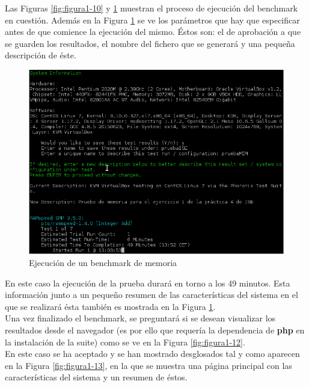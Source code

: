 Las Figuras \ref{fig:figura1-10} y \ref{fig:figura1-11} muestran el proceso de ejecución del benchmark en cuestión. Además en la Figura \ref{fig:figura1-11} se ve los parámetros que hay que especificar antes de que comience la ejecución del mismo. Éstos son: el de aprobación a que se guarden los resultados, el nombre del fichero que se generará y una pequeña descripción de éste.

\begin{figure}[H] %
	\centering
	\includegraphics[scale=0.8]{figuras/ejercicio1/figura1-11.png} 
	\caption{Ejecución de un benchmark de memoria} 
	\label{fig:figura1-11}
\end{figure}

En este caso la ejecución de la prueba durará en torno a los 49 minutos. Esta información junto a un pequeño resumen de las características del sistema en el que se realizará ésta también es mostrada en la Figura \ref{fig:figura1-11}.\\

Una vez finalizado el benchmark, se preguntará si se desean visualizar los resultados desde el navegador (es por ello que requería la dependencia de \textbf{php} en la instalación de la suite) como se ve en la Figura \ref{fig:figura1-12}. 
\\

En este caso se ha aceptado y se han mostrado desglosados tal y como aparecen en la Figura \ref{fig:figura1-13}, en la que se muestra una página principal con las características del sistema y un resumen de éstos.

